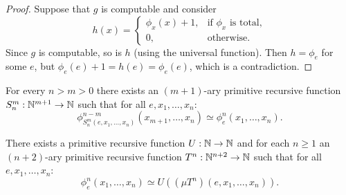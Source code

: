 \begin{proof}
  Suppose that $g$ is computable and consider
  \[
	h(x) =
	\begin{cases}
	  \phi_x(x) + 1, & \text{if $\phi_x$ is total}, \\
	  0, & \text{otherwise}.
	\end{cases}
  \]
  Since $g$ is computable, so is $h$ (using the universal function).
  Then $h = \phi_e$ for some $e$, but $\phi_e(e) + 1 = h(e) = \phi_e(e)$, which
  is a contradiction.
\end{proof}


\begin{theorem}[S-M-N]
  For every $n > m > 0$ there exists an $(m+1)$-ary primitive recursive function
  $S_n^m: \mathbb{N}^{m+1} \to \mathbb{N}$ such that for all $e, x_1, \ldots, x_n$:
  \[
	\phi_{S_n^m(e, x_1, \ldots, x_n)}^{n-m} (x_{m+1}, \ldots, x_n)
	\simeq \phi_e^n(x_1, \ldots, x_n).
  \]
\end{theorem}

\begin{theorem}
  There exists a primitive recursive function $U: \mathbb{N} \to \mathbb{N}$ and for each $n \ge
  1$ an $(n+2)$-ary primitive recursive function $T^n: \mathbb{N}^{n+2} \to \mathbb{N}$ such
  that for all $e, x_1, \ldots, x_n$:
  \[
	\phi_e^n(x_1, \ldots, x_n) \simeq U((\mu T^n)(e, x_1, \ldots, x_n)).
  \]
\end{theorem}



